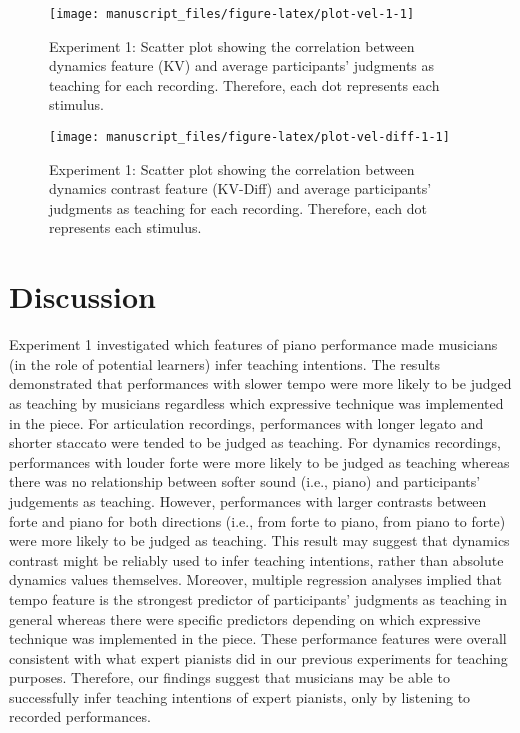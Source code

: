 \documentclass[
  man,floatsintext]{apa6}
\begin{document}
\begin{figure}

{\centering \texttt{[image: manuscript\_files/figure-latex/plot-vel-1-1]} 

}

\caption{\label{fig:vel-1}Experiment 1: Scatter plot showing the correlation between dynamics feature (KV) and average participants' judgments as teaching for each recording. Therefore, each dot represents each stimulus.}\label{fig:plot-vel-1}
\end{figure}

\begin{figure}

{\centering \texttt{[image: manuscript\_files/figure-latex/plot-vel-diff-1-1]} 

}

\caption{\label{fig:vel-diff-1}Experiment 1: Scatter plot showing the correlation between dynamics contrast feature (KV-Diff) and average participants' judgments as teaching for each recording. Therefore, each dot represents each stimulus.}\label{fig:plot-vel-diff-1}
\end{figure}

\clearpage

\hypertarget{discussion}{%
\section{Discussion}\label{discussion}}

Experiment 1 investigated which features of piano performance made musicians (in the role of potential learners) infer teaching intentions. The results demonstrated that performances with slower tempo were more likely to be judged as teaching by musicians regardless which expressive technique was implemented in the piece. For articulation recordings, performances with longer legato and shorter staccato were tended to be judged as teaching. For dynamics recordings, performances with louder forte were more likely to be judged as teaching whereas there was no relationship between softer sound (i.e., piano) and participants' judgements as teaching. However, performances with larger contrasts between forte and piano for both directions (i.e., from forte to piano, from piano to forte) were more likely to be judged as teaching. This result may suggest that dynamics contrast might be reliably used to infer teaching intentions, rather than absolute dynamics values themselves. Moreover, multiple regression analyses implied that tempo feature is the strongest predictor of participants' judgments as teaching in general whereas there were specific predictors depending on which expressive technique was implemented in the piece. These performance features were overall consistent with what expert pianists did in our previous experiments for teaching purposes. Therefore, our findings suggest that musicians may be able to successfully infer teaching intentions of expert pianists, only by listening to recorded performances.
\end{document}
